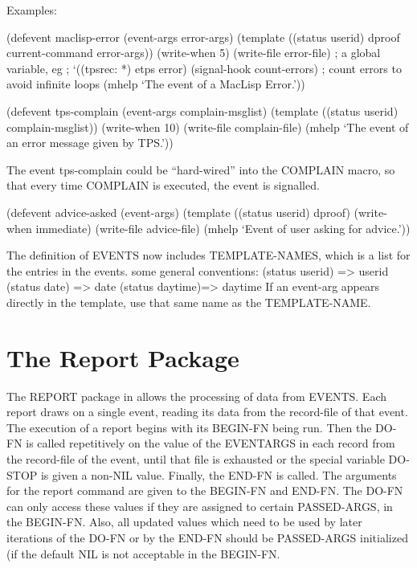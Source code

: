 Examples:
\begin{tpsexample}
(defevent maclisp-error
  (event-args error-args)
  (template ((status userid) dproof current-command error-args))
  (write-when 5)
  (write-file error-file)    ; a global variable, eg
			     ; `((tpsrec: *) etps error)
  (signal-hook count-errors) ; count errors to avoid infinite loops
  (mhelp `The event of a MacLisp Error.'))

(defevent tps-complain
  (event-args complain-msglist)
  (template ((status userid) complain-msglist))
  (write-when 10)
  (write-file complain-file)
  (mhelp `The event of an error message given by TPS.'))

{\rm The event tps-complain could be ``hard-wired'' into the COMPLAIN macro, so that every time COMPLAIN is
executed, the event is signalled.}

(defevent advice-asked
  (event-args)
  (template ((status userid) dproof)
  (write-when immediate)
  (write-file advice-file)
  (mhelp `Event of user asking for advice.'))

\end{tpsexample}

The definition of EVENTS now includes TEMPLATE-NAMES, which is
a list for the entries in the events.  some general conventions:
(status userid) => userid
(status date)   => date
(status daytime)=> daytime
If an event-arg appears directly in the template, use that same name as
the TEMPLATE-NAME.

\section{The Report Package}

The REPORT package in {\TPS} allows the processing of data
from EVENTS. Each report draws on a single event, reading
its data from the record-file of that event. The execution
of a report begins with its BEGIN-FN being run. Then
the DO-FN is called repetitively on the value of the EVENTARGS
in each record from the record-file of the event, until that
file is exhausted or the special variable DO-STOP is given a non-NIL
value. Finally, the END-FN is called. The arguments
for the report command are given to the BEGIN-FN and END-FN.
The DO-FN can only access these values if they are assigned to
certain PASSED-ARGS, in the BEGIN-FN. Also, all updated values
which need to be used by later iterations of the DO-FN or by
the END-FN should be PASSED-ARGS initialized (if the default NIL
is not acceptable in the BEGIN-FN.

